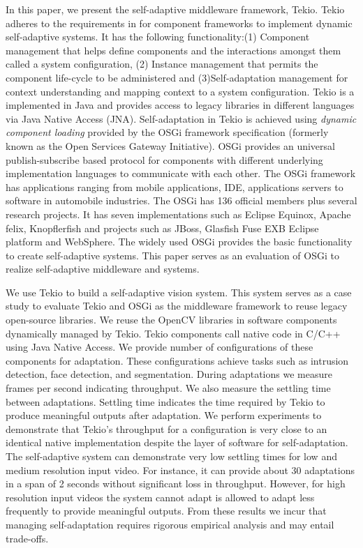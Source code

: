 \documentclass{acm_proc_article-sp}
\begin{document}
In this paper, we present the self-adaptive middleware framework, Tekio. Tekio adheres to the requirements in  \cite{Hallsteinsen2006} for component frameworks to implement dynamic self-adaptive systems. It has the following functionality:(1) Component management that helps define components and the interactions amongst them called a system configuration, (2) Instance management that permits the component life-cycle to be administered and (3)Self-adaptation management for context understanding and mapping context to a system configuration. Tekio is a implemented in Java and provides access to legacy libraries in different languages via Java Native Access (JNA). Self-adaptation in Tekio is achieved using \emph{dynamic component loading}  provided by the  OSGi framework specification (formerly known as the Open Services Gateway Initiative). OSGi provides an universal publish-subscribe based protocol for components with different underlying implementation languages to communicate with each other. The OSGi framework has applications ranging from mobile applications, IDE, applications servers to software in automobile industries. The OSGi has 136 official members plus several research projects. It has seven implementations such as Eclipse Equinox, Apache felix, Knopflerfish and projects such as JBoss, Glasfish Fuse EXB Eclipse platform and WebSphere. The widely used OSGi provides the basic functionality to create self-adaptive systems. This paper serves as an evaluation of OSGi to realize self-adaptive middleware and systems.

We use Tekio to build a self-adaptive vision system. This system serves as a case study to evaluate Tekio and OSGi as the middleware framework to reuse legacy open-source libraries. We reuse the OpenCV libraries \cite{Zelinsky2009} in software components dynamically managed by Tekio. Tekio components call native code in C/C++ using Java Native Access. We provide number of configurations of these components for adaptation. These configurations achieve tasks such as intrusion detection, face detection, and segmentation. During adaptations we measure frames per second indicating throughput. We also measure the settling time between adaptations. Settling time indicates the time required by Tekio to produce meaningful outputs after adaptation. We perform experiments to demonstrate that Tekio's throughput for a configuration is very close to an identical native implementation despite the layer of software for self-adaptation. The self-adaptive system can demonstrate very low settling times for low and medium resolution input video. For instance, it can provide about 30 adaptations in a span of 2 seconds without significant loss in throughput. However, for high resolution input videos the system cannot adapt is allowed to adapt less frequently to provide meaningful outputs. From these results we incur that managing  self-adaptation requires rigorous empirical analysis and may entail trade-offs.
\end{document}
